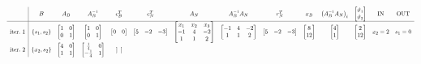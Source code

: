 \begin{equation*}
\scalemath{0.65}{
\begin{array}{ c|c c c c c c c c c c c c c }
 & B & A_{B} & A_{B}^{-1} & c_{B}^{T} & c_{N}^{T} & A_{N} & A_{B}^{-1} A_{N} & r_{N}^{T} & x_{B} & \left( A_{B}^{-1} A_{N}\right)_{i} & \begin{bmatrix}
\vartheta _{1}\\
\vartheta _{2}
\end{bmatrix} & \text{IN} & \text{OUT}\\
\hline
\text{iter.} \ 1 & \{s_{1} ,s_{2}\} & \begin{bmatrix}
1 & 0\\
0 & 1
\end{bmatrix} & \begin{bmatrix}
1 & 0\\
0 & 1
\end{bmatrix} & \begin{bmatrix}
0 & 0
\end{bmatrix} & \begin{bmatrix}
5 & -2 & -3
\end{bmatrix} & \begin{bmatrix}
x_{1} & x_{2} & x_{3}\\
-1 & 4 & -2\\
1 & 1 & 2
\end{bmatrix} & \begin{bmatrix}
-1 & 4 & -2\\
1 & 1 & 2
\end{bmatrix} & \begin{bmatrix}
5 & -2 & -3
\end{bmatrix} & \begin{bmatrix}
8\\
12
\end{bmatrix} & \begin{bmatrix}
4\\
1
\end{bmatrix} & \begin{bmatrix}
2\\
12
\end{bmatrix} & x_{2} =2 & s_{1} =0\\
\text{iter.} \ 2 & \{x_{2} ,s_{2}\} & \begin{bmatrix}
4 & 0\\
1 & 1
\end{bmatrix} & \begin{bmatrix}
\frac{1}{4} & 0\\
-\frac{1}{4} & 1
\end{bmatrix} & \begin{bmatrix}

\end{bmatrix}
\end{array}}
\end{equation*}
